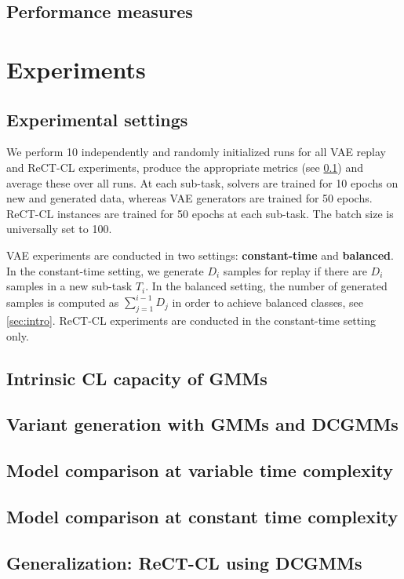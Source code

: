 \documentclass{article} %
\begin{document}
\subsection{Performance measures}\label{sec:exppeval}

\section{Experiments}\label{sec:exp}
% 
\subsection{Experimental settings}
%
We perform 10 independently and randomly initialized runs for all VAE replay and ReCT-CL experiments, produce the appropriate metrics (see \cref{sec:exppeval}) and average these over all runs.
At each sub-task, solvers are trained for 10 epochs on new and generated data, whereas VAE generators are trained for 50 epochs.
ReCT-CL instances are trained for 50 epochs at each sub-task.
The batch size is universally set to 100.

VAE experiments are conducted in two settings: \textbf{constant-time} and \textbf{balanced}. In the constant-time setting, 
we generate $D_i$ samples for replay if there are $D_i$ samples in a new sub-task $T_i$. In the balanced setting, the number of generated samples is computed as $\sum_{j=1}^{i-1} D_j$ in order to achieve balanced classes, see \cref{sec:intro}.
ReCT-CL experiments are conducted in the constant-time setting only.
%
\subsection{Intrinsic CL capacity of GMMs}
\subsection{Variant generation with GMMs and DCGMMs}
\subsection{Model comparison at variable time complexity}
\subsection{Model comparison at constant time complexity}
\subsection{Generalization: ReCT-CL using DCGMMs}
\end{document}
